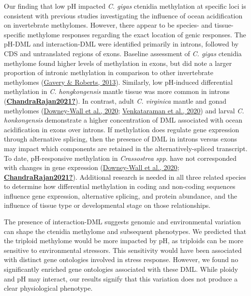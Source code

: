 \documentclass [11pt, proquest] {uwthesis}[2015/03/03]
\begin{document}
Our finding that low pH impacted \emph{C. gigas} ctenidia methylation at specific loci is consistent with previous studies investigating the influence of ocean acidification on invertebrate methylomes. However, there appear to be species- and tissue-specific methylome responses regarding the exact location of genic responses. The pH-DML and interaction-DML were identified primarily in introns, followed by CDS and untranslated regions of exons. Baseline assessment of \emph{C. gigas} ctenidia methylome found higher levels of methylation in exons, but did note a larger proportion of intronic methylation in comparison to other invertebrate methylomes (\protect\hyperlink{ref-Gavery2013}{Gavery \& Roberts, 2013}). Similarly, low pH-induced differential methylation in \emph{C. hongkongensis} mantle tissue was more common in introns (\protect\hyperlink{ref-ChandraRajan2021}{\textbf{ChandraRajan2021?}}). In contrast, adult \emph{C. virginica} mantle and gonad methylomes (\protect\hyperlink{ref-Downey-Wall2020}{Downey-Wall et al., 2020}; \protect\hyperlink{ref-Venkataraman2020}{Venkataraman et al., 2020}) and larval \emph{C. honkongensis} demonstrate a higher concentration of DML associated with ocean acidification in exons over introns. If methylation does regulate gene expression through alternative splicing, then the presence of DML in introns versus exons may impact which components are retained in the alternatively-spliced transcript. To date, pH-responsive methylation in \emph{Crassostrea spp}. have not corresponded with changes in gene expression (\protect\hyperlink{ref-Downey-Wall2020}{Downey-Wall et al., 2020}; \protect\hyperlink{ref-ChandraRajan2021}{\textbf{ChandraRajan2021?}}). Additional research is needed in all three related species to determine how differential methylation in coding and non-coding sequences influence gene expression, alternative splicing, and protein abundance, and the influence of tissue type or developmental stage on those relationships.

The presence of interaction-DML suggests genomic and environmental variation can shape the ctenidia methylome and subsequent phenotypes. We predicted that the triploid methylome would be more impacted by pH, as triploids can be more sensitive to environmental stressors. This sensitivity would have been associated with distinct gene ontologies involved in stress response. However, we found no significantly enriched gene ontologies associated with these DML. While ploidy and pH may interact, our results signify that this variation does not produce a clear physiological phenotype.
\end{document}
